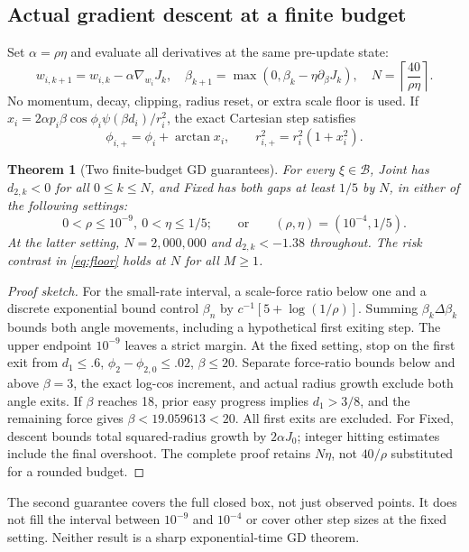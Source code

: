 \documentclass[10pt,a4paper]{article}
\newtheorem{theorem}{Theorem}
\newenvironment{sketch}{\begin{proof}[Proof sketch]}{\end{proof}}
\newcommand{\B}{\mathcal B}
\begin{document}
\subsection{Actual gradient descent at a finite budget}
Set $\alpha=\rho\eta$ and evaluate all derivatives at the same pre-update state:
\begin{equation}
w_{i,k+1}=w_{i,k}-\alpha\nabla_{w_i}J_k,\quad
\beta_{k+1}=\max(0,\beta_k-\eta\partial_\beta J_k),\quad
N=\left\lceil\frac{40}{\rho\eta}\right\rceil.
\label{eq:gd}
\end{equation}
No momentum, decay, clipping, radius reset, or extra scale floor is used. If $x_i=2\alpha p_i\beta\cos\phi_i\psi(\beta d_i)/r_i^2$, the exact Cartesian step satisfies
\begin{equation}
\phi_{i,+}=\phi_i+\arctan x_i,\qquad
r_{i,+}^2=r_i^2(1+x_i^2).
\label{eq:polar}
\end{equation}
\begin{theorem}[Two finite-budget GD guarantees]\label{thm:gd}
For every $\xi\in\B$, Joint has $d_{2,k}<0$ for all $0\le k\le N$, and Fixed has both gaps at least $1/5$ by $N$, in either of the following settings:
\[
0<\rho\le10^{-9},\ 0<\eta\le1/5;
\qquad\text{or}\qquad (\rho,\eta)=(10^{-4},1/5).
\]
At the latter setting, $N=2{,}000{,}000$ and $d_{2,k}<-1.38$ throughout. The risk contrast in \eqref{eq:floor} holds at $N$ for all $M\ge1$.
\end{theorem}
\begin{sketch}
For the small-rate interval, a scale-force ratio below one and a discrete exponential bound control $\beta_n$ by $c^{-1}[5+\log(1/\rho)]$. Summing $\beta_k\Delta\beta_k$ bounds both angle movements, including a hypothetical first exiting step. The upper endpoint $10^{-9}$ leaves a strict margin.
At the fixed setting, stop on the first exit from $d_1\le.6$, $\phi_2-\phi_{2,0}\le.02$, $\beta\le20$. Separate force-ratio bounds below and above $\beta=3$, the exact log-cos increment, and actual radius growth exclude both angle exits. If $\beta$ reaches 18, prior easy progress implies $d_1>3/8$, and the remaining force gives $\beta<19.059613<20$. All first exits are excluded. For Fixed, descent bounds total squared-radius growth by $2\alpha J_0$; integer hitting estimates include the final overshoot. The complete proof retains $N\eta$, not $40/\rho$ substituted for a rounded budget.
\end{sketch}
The second guarantee covers the full closed box, not just observed points. It does not fill the interval between $10^{-9}$ and $10^{-4}$ or cover other step sizes at the fixed setting. Neither result is a sharp exponential-time GD theorem.
\end{document}
